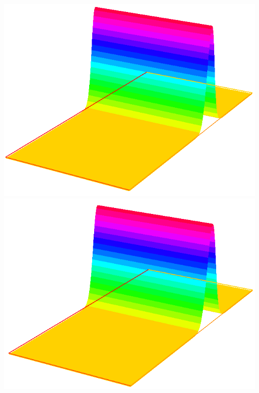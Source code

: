 \includegraphics[scale=0.3]{images/capture3.png}
\includegraphics[scale=0.3]{images/capture4.png}\\
